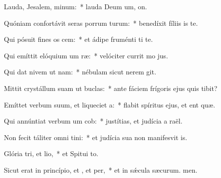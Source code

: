 \item Lauda, Jesalem, minum:~* lauda Deum um, on.
\item Quóniam confortávit seras porrum turum:~* benedíxit fíliis is  te.
\item Qui pósuit fines os cem:~* et ádipe fruménti ti te.
\item Qui emíttit elóquium um ræ:~* velóciter currit mo jus.
\item Qui dat nivem ut nam:~* nébulam sicut nerem git.
\item Mittit crystállum suam ut buclas:~* ante fáciem frígoris ejus quis tibit?
\item Emíttet verbum suum, et liqueciet a:~* flabit spíritus ejus, et ent quæ.
\item Qui annúntiat verbum um cob:~* justítias, et judícia a raël.
\item Non fecit táliter omni tini:~* et judícia sua non manifesvit is.
\item Glória tri, et lio,~* et Spitui to.
\item Sicut erat in princípio, et , et per,~* et in sǽcula sæcurum. men.

